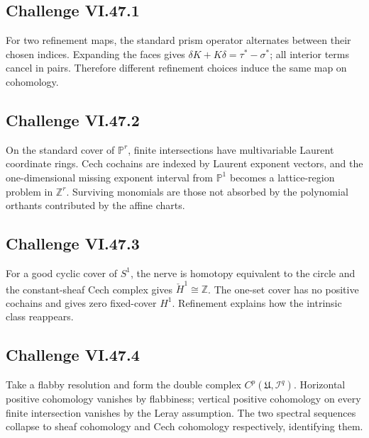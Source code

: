 \subsection*{Challenge VI.47.1}
\begin{solution}
For two refinement maps, the standard prism operator alternates between their chosen indices.  Expanding the faces gives \(\delta K+K\delta=\tau^*-\sigma^*\); all interior terms cancel in pairs.  Therefore different refinement choices induce the same map on cohomology.
\end{solution}

\subsection*{Challenge VI.47.2}
\begin{solution}
On the standard cover of \(\mathbb P^r\), finite intersections have multivariable Laurent coordinate rings.  Cech cochains are indexed by Laurent exponent vectors, and the one-dimensional missing exponent interval from \(\mathbb P^1\) becomes a lattice-region problem in \(\mathbb Z^r\).  Surviving monomials are those not absorbed by the polynomial orthants contributed by the affine charts.
\end{solution}

\subsection*{Challenge VI.47.3}
\begin{solution}
For a good cyclic cover of \(S^1\), the nerve is homotopy equivalent to the circle and the constant-sheaf Cech complex gives \(\check H^1\cong\mathbb Z\).  The one-set cover has no positive cochains and gives zero fixed-cover \(H^1\).  Refinement explains how the intrinsic class reappears.
\end{solution}

\subsection*{Challenge VI.47.4}
\begin{solution}
Take a flabby resolution and form the double complex \(C^p(\mathfrak U,\mathcal I^q)\).  Horizontal positive cohomology vanishes by flabbiness; vertical positive cohomology on every finite intersection vanishes by the Leray assumption.  The two spectral sequences collapse to sheaf cohomology and Cech cohomology respectively, identifying them.
\end{solution}

